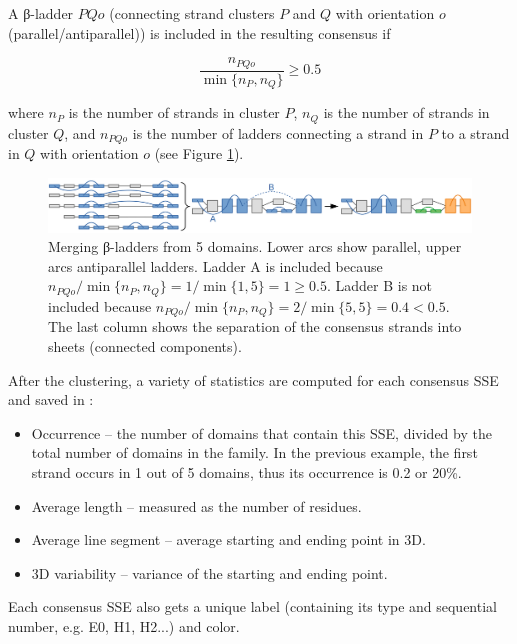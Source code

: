 \documentclass{article}
\begin{document}
A β-ladder \(PQo\) (connecting strand clusters \(P\) and \(Q\) with orientation \(o\) (parallel/antiparallel)) 
is included in the resulting consensus if

\[  \frac { n_{PQo} } { \min{\{n_P, n_Q\}} } \geq 0.5  \]

where \(n_P\) is the number of strands in cluster \(P\), 
\(n_Q\) is the number of strands in cluster \(Q\),
and \(n_{PQo}\) is the number of ladders connecting a strand in \(P\) to a strand in \(Q\)
with orientation \(o\) (see Figure \ref{fig:dag_ladders}).

\begin{figure}[h!]
  \centering\includegraphics[width=\linewidth]{figures/dag_ladders.png}
  \caption{Merging β-ladders from 5 domains. 
  Lower arcs show parallel, upper arcs antiparallel ladders.
  Ladder A is included because \( n_{PQo} / \min{\{n_P, n_Q\}} = 1 / \min{\{1, 5\}} = 1 \geq 0.5\).
  Ladder B is not included because \( n_{PQo} / \min{\{n_P, n_Q\}} = 2 / \min{\{5, 5\}} = 0.4 < 0.5\).
  The last column shows the separation of the consensus strands into sheets (connected components).}
  \label{fig:dag_ladders}
\end{figure}

After the clustering, a variety of statistics are computed for each consensus SSE and saved in : 
\begin{itemize}
  \item
    Occurrence -- the number of domains that contain this SSE, 
    divided by the total number of domains in the family. 
    In the previous example, the first strand occurs in 1 out of 5 domains, 
    thus its occurrence is 0.2 or 20\%.
  \item
    Average length -- measured as the number of residues.
  \item
    Average line segment -- average starting and ending point in 3D.
  \item
    3D variability -- variance of the starting and ending point.
\end{itemize}

Each consensus SSE also gets a unique label (containing its type and sequential number, e.g. E0, H1, H2...) and color.

\end{document}
